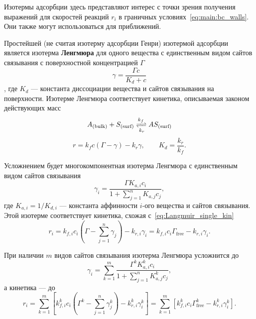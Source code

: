 \documentclass[oneside,final,12pt]{extreport}
\begin{document}
Изотермы адсорбции здесь представляют интерес с точки зрения получения
выражений для скоростей реакций $r_i$ в
граничных условиях~\eqref{eq:main:bc_walls}.
Они также могут использоваться для приближений.

Простейшей (не считая изотерму адсорбции Генри) изотермой адсорбции является
изотерма \textbf{Ленгмюра} для одного вещества
с единственным видом сайтов связывания
с поверхностной концентрацией $\Gamma$
\begin{equation}
  \gamma = \frac{\Gamma c}{K_d + c}
\label{eq:Langmuir_single_eq}
\end{equation}%
\cite{bib:adsorption_reaction_principles},
где $K_d$ --- константа диссоциации вещества и сайтов связывания на поверхности.
Изотерме Ленгмюра соответствует кинетика, описываемая законом действующих масс
\[ A_{\left(\text{bulk}\right)} + S_{\left(\text{surf}\right)} \xrightleftharpoons[k_r]{k_f} AS_{\left(\text{surf}\right)} \]
\begin{equation}
  r = k_f c \left(\Gamma - \gamma\right) - k_r \gamma,\qquad K_d = \frac{k_r}{k_f}.
\label{eq:Langmuir_single_kin}
\end{equation}

Усложнением будет многокомпонентная изотерма Ленгмюра с единственным видом
сайтов связывания
\begin{equation}
  \gamma_i = \frac{\Gamma K_{a,i} c_i}{1 + \sum\limits_{j=1}^{n} K_{a,j} c_j},
\label{eq:Langmuir_multi_eq}
\end{equation}
где $K_{a,i} = 1/K_{d,i}$ --- константа аффинности $i$-ого вещества и
сайтов связывания. Этой изотерме соответствует кинетика,
схожая с~\eqref{eq:Langmuir_single_kin}
\begin{equation}
  r_i = k_{f,i} c_i \left(\Gamma - \sum_{j=1}^{n} \gamma_j\right) - k_{r,i}\gamma_i =
        k_{f,i} c_i \Gamma_{\text{free}} - k_{r,i}\gamma_i.
\label{eq:Langmuir_multi_kin}
\end{equation}

При наличии $m$ видов сайтов связывания изотерма Ленгмюра усложнится до
\begin{equation}
  \gamma_i = \sum_{k=1}^{m}\frac{\Gamma^k K_{a,i}^k c_i}{1 + \sum\limits_{j=1}^{n} K_{a,j}^k c_j},
\label{eq:Langmuir_multi_many_eq}
\end{equation}
а кинетика --- до
\begin{equation}
  r_i = \sum_{k=1}^{m} \left[
            k_{f,i}^k c_i \left(\Gamma^k - \sum_{j=1}^{n} \gamma_j^k\right) - k_{r,i}^k\gamma_i^k
          \right] =
        \sum_{k=1}^{m} \left[
            k_{f,i}^k c_i \Gamma_{\text{free}}^k - k_{r,i}^k\gamma_i^k
          \right].
\label{eq:Langmuir_multi_many_kin}
\end{equation}
\end{document}
